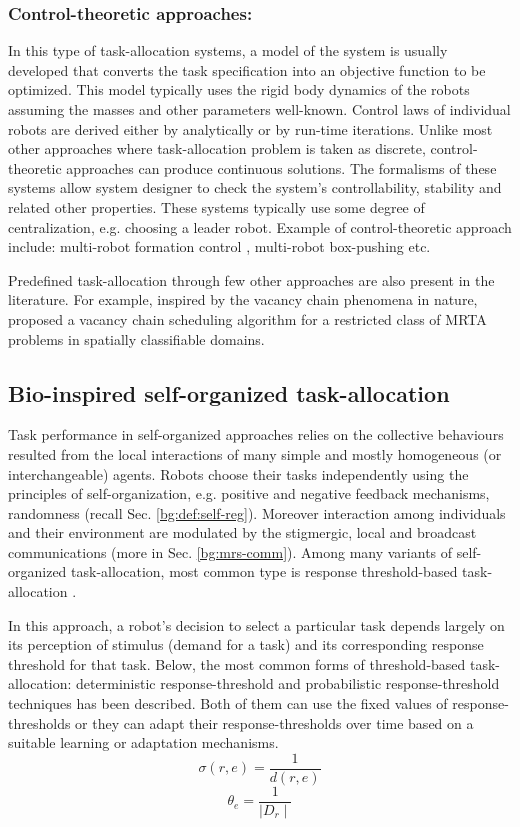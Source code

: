 \subsubsection*{Control-theoretic approaches:}
In this type of task-allocation systems, a model of the system is usually developed that converts the task specification into an objective function to be optimized. This model typically  uses  the rigid  body dynamics of the robots assuming the masses and other parameters well-known. Control laws of individual robots are derived either by analytically or by run-time iterations. Unlike most other approaches where task-allocation problem is taken as discrete, control-theoretic approaches can produce continuous  solutions. The formalisms of these systems allow system designer to check the system's controllability, stability and related other properties.  These systems typically use some degree of centralization, e.g. choosing a leader robot.  Example of control-theoretic approach include: multi-robot formation control \cite{Belta+2004}, multi-robot box-pushing \cite{Pereira+2003}  etc.

Predefined task-allocation through few other approaches are also present in the literature. For example, inspired by the vacancy chain phenomena in nature,  proposed a vacancy chain scheduling algorithm for a restricted class of MRTA problems in spatially classifiable domains.
\subsection{Bio-inspired self-organized task-allocation}
\label{bg:mrta:self-organized}
Task performance in self-organized approaches relies on the collective behaviours resulted from the local interactions of many simple and mostly homogeneous (or interchangeable) agents. Robots choose their tasks independently using the principles of self-organization, e.g. positive and negative feedback mechanisms, randomness (recall Sec. \ref{bg:def:self-reg}). Moreover interaction among individuals and their environment are modulated by the stigmergic, local and broadcast communications (more in Sec. \ref{bg:mrs-comm}).  Among many variants of self-organized task-allocation, most common type is response threshold-based task-allocation \cite{Bonabeau+1999}. 

In this approach, a robot's decision to select a particular task depends largely on its perception of stimulus (demand for a task) and its corresponding response threshold for that task. Below, the most common forms of threshold-based task-allocation:  deterministic response-threshold and probabilistic response-threshold techniques  has been described. Both of them can use the fixed values of response-thresholds or they can adapt their response-thresholds over time based on a suitable learning or adaptation mechanisms.
\begin{equation}
\label{eqn:fixed-response-th1}
\sigma (r,e) = \frac{1}{d(r,e)}
\end{equation}
\begin{equation}
\label{eqn:fixed-response-th2}
\theta_{e} = \frac{1}{\mid D_{r} \mid}
\end{equation}
